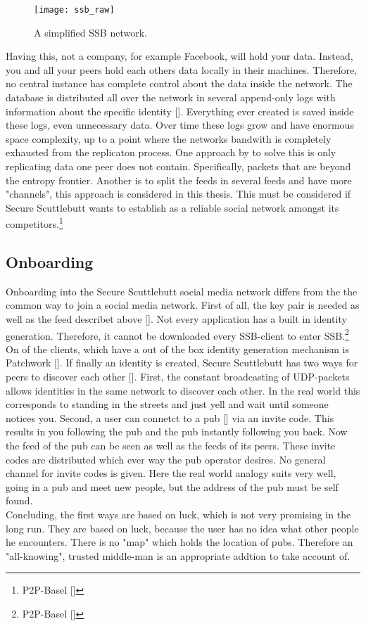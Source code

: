 \begin{figure}
    \centering
    \texttt{[image: ssb\_raw]}
    \caption{A simplified SSB network.}
    \label{fig:sbb-raw}
\end{figure}

Having this, not a company, for example Facebook, will hold your data. Instead, you and all your peers hold each others data locally in their machines. Therefore, no central instance has complete control about the data inside the network. The database is distributed all over the network in several append-only logs with information about the specific identity []. Everything ever created is saved inside these logs, even unnecessary data. Over time these logs grow and have enormous space complexity, up to a point where the networks bandwith is completely exhausted from the replicaton process. One approach by \citet{entropy} to solve this is only replicating data one peer does not contain. Specifically, packets that are beyond the entropy frontier. Another is to split the feeds in several feeds and have more "channels", this approach is considered in this thesis.
This must be considered if Secure Scuttlebutt wants to establish as a reliable social network amongst its competitors.\footnote{P2P-Basel []}

\subsection{Onboarding}
Onboarding into the Secure Scuttlebutt social media network differs from the the common way to join a social media network. First of all, the key pair is needed as well as the feed describet above []. Not every application has a built in identity generation. Therefore, it cannot be downloaded every SSB-client to enter SSB.\footnote{P2P-Basel []} On of the clients, which have a out of the box identity generation mechanism is Patchwork []. If finally an identity is created, Secure Scuttlebutt has two ways for peers to discover each other []. First, the constant broadcasting of UDP-packets allows identities in the same network to discover each other. In the real world this corresponds to standing in the streets and just yell and wait until someone notices you. Second, a user can connetct to a pub [] via an invite code. This results in you following the pub and the pub instantly following you back. Now the feed of the pub can be seen as well as the feeds of its peers. These invite codes are distributed which ever way the pub operator desires. No general channel for invite codes is given. Here the real world analogy suits very well, going in a pub and meet new people, but the address of the pub must be self found. 
\\
Concluding, the first ways are based on luck, which is not very promising in the long run. They are based on luck, because the user has no idea what other people he encounters. There is no "map" which holds the location of pubs. Therefore an "all-knowing", trusted middle-man is an appropriate addtion to take account of.
